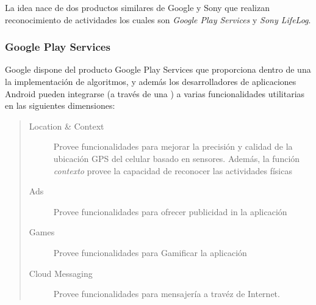La idea nace de dos productos similares de Google y Sony que realizan reconocimiento de actividades los cuales son
\emph{Google Play Services} y \emph{Sony LifeLog}.


\subsubsection{Google Play Services}
\label{intro:har-google-play-services}\label{intro:google-play-services}
Google dispone del producto Google Play Services \cite{Google2016ps}
que proporciona dentro de una  la implementación de algoritmos, y además los desarrolladores de aplicaciones
Android pueden integrarse (a través de una  \cite{Google2016l}) a varias
funcionalidades utilitarias en las siguientes dimensiones:
\begin{quote}
\begin{description}
\item[{Location \& Context}] \leavevmode
Provee funcionalidades para mejorar la precisión y calidad de la ubicación GPS del celular basado en sensores.
Además, la función \emph{contexto} provee la capacidad de reconocer las actividades físicas

\item[{Ads}] \leavevmode
Provee funcionalidades para ofrecer publicidad in la aplicación

\item[{Games}] \leavevmode
Provee funcionalidades para Gamificar la aplicación

\item[{Cloud Messaging}] \leavevmode
Provee funcionalidades para mensajería a travéz de Internet.

\end{description}


\end{quote}

